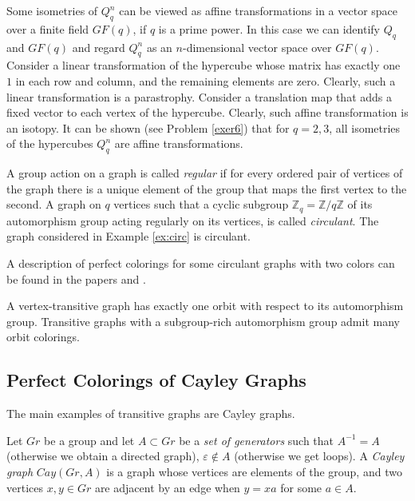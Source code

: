 \documentclass[11pt]{article}
\theoremstyle{definition}
\begin{document}
{{Some isometries of $Q^n_q$ can be viewed as affine
transformations in a vector space over a finite field $GF(q)$, if
$q$
is a prime power. In this case we can identify $Q_q$ and $GF(q)$ and regard $Q^n_q$ as an $n$-dimensional  
vector space over $GF(q)$. Consider a linear transformation
of the hypercube whose matrix has exactly one $1$ in each
row and column, and the remaining elements are zero. Clearly,
such  a linear transformation is a parastrophy. Consider a
translation map that adds a fixed vector to each vertex of the hypercube. Clearly, such  affine transformation
is an isotopy. It can be shown (see Problem \ref{exer6}) that for
$q=2,3$, all isometries of the hypercubes $Q^n_q$ are affine
transformations.

A group action on a graph is called {\sl regular}
if for every ordered pair of vertices of the graph there is a unique element of the group that maps the first vertex to the second.
{A graph on $q$ vertices such that a cyclic subgroup
$\mathbb{Z}_q=\mathbb{Z}/q\mathbb{Z}$ of its automorphism group acting
regularly
on its vertices, is called  {\sl circulant}. The graph considered in
Example \ref{ex:circ} is  circulant.}

A description of perfect colorings for some circulant graphs with two colors
can be found in the papers \cite{Horosh} and \cite{ParLis}.






A vertex-transitive
graph has exactly one orbit with respect to its
automorphism group. Transitive graphs with a subgroup-rich
automorphism group admit many orbit colorings. 


\subsection{Perfect Colorings of Cayley Graphs}\label{Orbit}


The main examples
of transitive graphs are Cayley graphs.




 Let $Gr$ be a group and let $A\subset Gr$ be a {\sl set of generators}
such that $A^{-1}=A$ (otherwise we obtain a directed graph),
$\varepsilon\not\in A$ (otherwise we get loops). A {\sl Cayley graph} $Cay(Gr,A)$
is a graph whose vertices are elements of the group, and two
vertices $x,y\in Gr$ are adjacent by an edge when $y=xa$ for some
$a\in A$. 


}}
\end{document}
